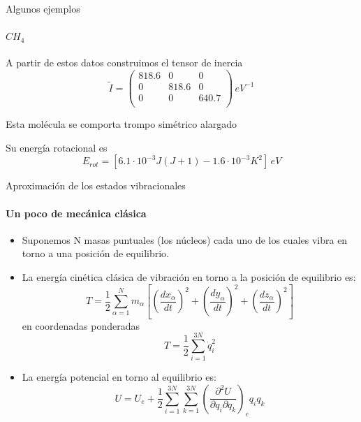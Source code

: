 \documentclass[a4paper]{beamer}
\begin{document}
\begin{frame}{Algunos ejemplos}
\framesubtitle{$CH_4$}
 A partir de estos datos construimos el tensor de inercia
 $$ \tilde I =
 \begin{pmatrix}
 818.6 & 0 & 0 \\
 0 & 818.6 & 0 \\
 0 & 0 & 640.7\\
 \end{pmatrix}
 \, eV^{-1}
 $$
 
Esta molécula se comporta trompo simétrico alargado

Su energía rotacional es
 $$E_{rot}=[6.1\cdot 10^{-3}J(J+1) -1.6 \cdot 10^{-3}K^2] \, eV$$
\end{frame}

\begin{frame}{Aproximación de los estados vibracionales}
\framesubtitle{Un poco de mecánica clásica}
\begin{itemize}
\item Suponemos N masas puntuales (los núcleos) cada uno de los cuales vibra en torno a una posición de equilibrio.
\item La energía cinética clásica de vibración en torno a la posición de equilibrio es:
\begin{equation*}
T= \frac{1}{2}\sum_{\alpha = 1}^Nm_\alpha\left[\left(\frac{dx_\alpha}{dt}\right)^2+\left(\frac{dy_\alpha}{dt}\right)^2+\left(\frac{dz_\alpha}{dt}\right)^2\right]
\end{equation*}
en coordenadas ponderadas
\begin{equation*}
T=\frac{1}{2}\sum_{i=1}^{3N}\dot q_i^2
\end{equation*}
\item La energía potencial en torno al equilibrio es:
\begin{equation*}
U = U_e + \frac{1}{2}\sum_{i=1}^{3N}\sum_{k=1}^{3N}\left(\frac{\partial^2U}{\partial q_i \partial q_k}\right)_eq_iq_k
\end{equation*}
\end{itemize}
\end{frame}
\end{document}
